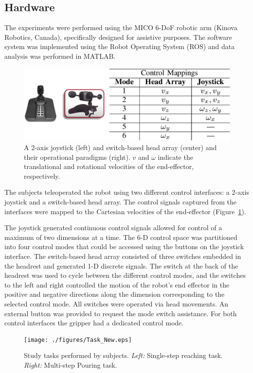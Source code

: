 \subsection{Hardware}\label{ssec:hardware}
The experiments were performed using the MICO 6-DoF robotic arm (Kinova Robotics, Canada), specifically designed for assistive purposes. The software system was implemented using the Robot Operating System (ROS) and data analysis was performed in MATLAB. 
\begin{figure}[b]
	\centering
	\includegraphics[width = 1\hsize, height = 0.14\vsize]{./figures/INTER_4.eps}
	\caption{A 2-axis joystick (left) and switch-based head array (center) and their operational paradigms (right). $v$ and $\omega$ indicate the translational and rotational velocities of the end-effector, respectively.}
	\label{fig:interfaces}
\end{figure}
The subjects teleoperated the robot using two different control interfaces: a 2-axis joystick and a switch-based head array. The control signals captured from the interfaces were mapped to the Cartesian velocities of the end-effector (Figure~\ref{fig:interfaces}).

The joystick generated continuous control signals allowed for control of a maximum of two dimensions at a time. The 6-D control space was partitioned into four control modes that could be accessed using the buttons on the joystick interface. The switch-based head array consisted of three switches embedded in the headrest and generated 1-D discrete signals. The switch at the back of the headrest was used to cycle between the different control modes, and the switches to the left and right controlled the motion of the robot's end effector in the positive and negative directions along the dimension corresponding to the selected control mode. All switches were operated via head movements.
An external button was provided to request the mode switch assistance. For both control interfaces the gripper had a dedicated control mode. 
\begin{figure}[ht!]
	\texttt{[image: ./figures/Task\_New.eps]}
	\caption{Study tasks performed by subjects. \textit{Left:} Single-step reaching task. \textit{Right:} Multi-step Pouring task. }
	\label{fig:tasks}
\end{figure}

